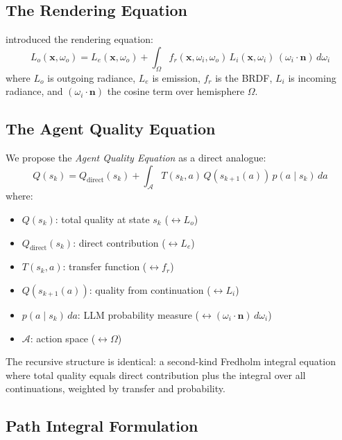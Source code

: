 \documentclass[11pt,twocolumn]{article}
\theoremstyle{definition}
\newcommand{\Aspace}{\mathcal{A}}
\newcommand{\Qdirect}{Q_{\text{direct}}}
\newcommand{\bx}{\mathbf{x}}
\newcommand{\bn}{\mathbf{n}}
\begin{document}
\subsection{The Rendering Equation}

\citet{kajiya1986rendering} introduced the rendering equation:
\begin{equation}\label{eq:rendering}
  L_o(\bx, \omega_o) = L_e(\bx, \omega_o)
    + \int_\Omega f_r(\bx, \omega_i, \omega_o)\,
      L_i(\bx, \omega_i)\,
      (\omega_i \cdot \bn)\,d\omega_i
\end{equation}
where $L_o$ is outgoing radiance, $L_e$ is emission,
$f_r$ is the BRDF, $L_i$ is incoming radiance,
and $(\omega_i \cdot \bn)$ the cosine term over hemisphere $\Omega$.

\subsection{The Agent Quality Equation}

We propose the \emph{Agent Quality Equation} as a direct analogue:
\begin{equation}\label{eq:agent-quality}
  Q(s_k) = \Qdirect(s_k)
    + \int_{\Aspace} T(s_k, a)\,Q(s_{k+1}(a))\,p(a \mid s_k)\,da
\end{equation}
where:
\begin{itemize}[nosep]
  \item $Q(s_k)$: total quality at state $s_k$ \quad($\leftrightarrow L_o$)
  \item $\Qdirect(s_k)$: direct contribution \quad($\leftrightarrow L_e$)
  \item $T(s_k, a)$: transfer function \quad($\leftrightarrow f_r$)
  \item $Q(s_{k+1}(a))$: quality from continuation \quad($\leftrightarrow L_i$)
  \item $p(a \mid s_k)\,da$: LLM probability measure \quad($\leftrightarrow (\omega_i\!\cdot\!\bn)\,d\omega_i$)
  \item $\Aspace$: action space \quad($\leftrightarrow \Omega$)
\end{itemize}

The recursive structure is identical: a second-kind Fredholm integral equation
where total quality equals direct contribution plus the integral over all continuations,
weighted by transfer and probability.

\subsection{Path Integral Formulation}
\end{document}
